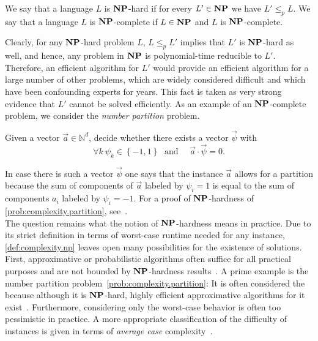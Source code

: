 \begin{definition}
  \label{def:complexity.hard_and_complete}
  We say that a language $L$ is $\mathbf{NP}$-hard if for every $L' \in \mathbf{NP}$ we have $L' \le_p L$.
  We say that a language $L$ is $\mathbf{NP}$-complete if $L \in \mathbf{NP}$ and $L$ is $\mathbf{NP}$-complete.
\end{definition}

Clearly, for any $\mathbf{NP}$-hard problem $L$, $L \le_p L'$ implies that $L'$ is $\mathbf{NP}$-hard as well, and hence, any problem in $\mathbf{NP}$ is polynomial-time reducible to $L'$.
Therefore, an efficient algorithm for $L'$ would provide an efficient algorithm for a large number of other problems, which are widely considered difficult and which have been confounding experts for years.
This fact is taken as very strong evidence that $L'$ cannot be solved efficiently.
As an example of an $\mathbf{NP}$-complete problem, we consider the \emph{number partition} problem.
\begin{problem}\label{prob:complexity.partition}
  Given a vector $\vec a \in \mathbb{N}^d$, decide whether there exists a vector $\vec \psi$ with
  \[
    \forall{k}\:\psi_{k}\in\left\{ -1,1\right\} \;\textrm{ and }\quad \vec a \cdot \vec\psi=0.
    \label{eq:ellpos.partition_vector}
  \]
\end{problem}
In case there is such a vector $\vec \psi$ one says that the instance $\vec a$ allows for a partition because the sum of components of $\vec a$ labeled by $\psi_i = 1$ is equal to the sum of components $a_i$ labeled by $\psi_i = -1$.
For a proof of $\mathbf{NP}$-hardness of \cref{prob:complexity.partition}, see~\cite{Garey_2002_Computers}.\\


The question remains what the notion of $\mathbf{NP}$-hardness means in practice.
Due to its strict definition in terms of worst-case runtime needed for any instance, \cref{def:complexity.np} leaves open many possibilities for the existence of  solutions.
First, approximative or probabilistic algorithms often suffice for all practical purposes and are not bounded by $\mathbf{NP}$-hardness results~\cite{Garey_2002_Computers,Arora_2009_Computational}.
A prime example is the number partition problem~\ref{prob:complexity.partition}:
It is often considered the  because although it is $\mathbf{NP}$-hard, highly efficient approximative algorithms for it exist~\cite{Kellerer_1997_Efficient}.
Furthermore, considering only the worst-case behavior is often too pessimistic in practice.
A more appropriate classification of the difficulty of  instances is given in terms of \emph{average case} complexity~\cite{Arora_2009_Computational}.

